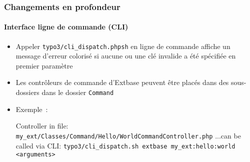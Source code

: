 \begin{frame}[fragile]
	\frametitle{Changements en profondeur}
	\framesubtitle{Interface ligne de commande (CLI)}

	\lstset{basicstyle=\tiny\ttfamily}

	\begin{itemize}

		\item Appeler \texttt{typo3/cli\_dispatch.phpsh} en ligne de commande affiche un message d'erreur colorisé
			si aucune ou une clé invalide a été spécifiée en premier paramètre

		\item Les contrôleurs de commande d'Extbase peuvent être placés dans des sous-dossiers dans le dossier
			\texttt{Command}

		\item Exemple~:\newline

			Controller in file:\newline
			\smaller\texttt{my\_ext/Classes/Command/Hello/WorldCommandController.php}\normalsize\newline
			...can be called via CLI:\newline
			\smaller\texttt{typo3/cli\_dispatch.sh extbase my\_ext:hello:world <arguments>}\normalsize

	\end{itemize}

\end{frame}


